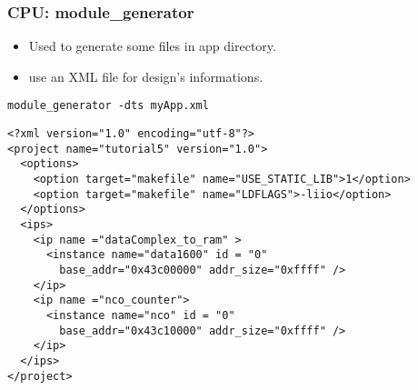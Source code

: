 \documentclass[compress,10pt]{beamer}
\begin{document}

\begin{frame}[containsverbatim]
\frametitle{CPU: module\_generator}
\begin{itemize}
\item Used to generate some files in app directory.
\item use an XML file for design's informations.
\end{itemize}

{\small \verb!module_generator -dts myApp.xml!}

\hspace{-0.6cm}
{\footnotesize \begin{verbatim}
<?xml version="1.0" encoding="utf-8"?>
<project name="tutorial5" version="1.0">
  <options>
    <option target="makefile" name="USE_STATIC_LIB">1</option>
    <option target="makefile" name="LDFLAGS">-liio</option>
  </options>
  <ips>
    <ip name ="dataComplex_to_ram" >
      <instance name="data1600" id = "0"
        base_addr="0x43c00000" addr_size="0xffff" />
    </ip>
    <ip name ="nco_counter">
      <instance name="nco" id = "0"
        base_addr="0x43c10000" addr_size="0xffff" />
    </ip>
  </ips>
</project>
\end{verbatim}
}
\end{frame}
\end{document}
